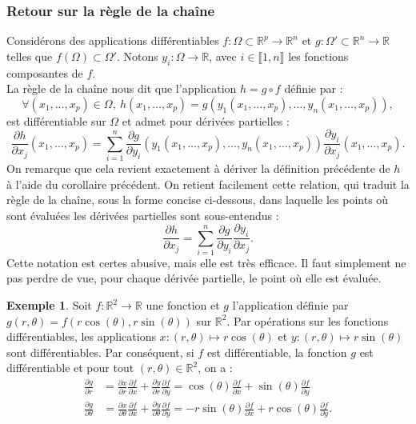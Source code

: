 \documentclass[french]{article}
\newcommand{\R}{\mathbb{R}}
\theoremstyle{plain}
\theoremstyle{definition}
\newtheorem*{ex}{Exemple}
\theoremstyle{remark}
\begin{document}
\subsubsection*{Retour sur la règle de la chaîne}

Considérons des applications différentiables $f:\Omega\subset\R^p\to\R^n$ et $g:\Omega'\subset\R^n\to\R$ telles que $f(\Omega)\subset\Omega'$. Notons $y_i:\Omega\to\R$, avec $i\in\llbracket1,n\rrbracket$ les fonctions composantes de $f$. \\
La règle de la chaîne nous dit que l'application $h=g\circ f$ définie par :
$$\forall (x_1,\ldots,x_p)\in\Omega,\ h(x_1,\ldots,x_p)=g(y_1(x_1,\ldots,x_p),\ldots,y_n(x_1,\ldots,x_p)),$$ est différentiable sur $\Omega$ et admet pour dérivées partielles :
$$\frac{\partial h}{\partial x_j}(x_1,\ldots,x_p)=\sum_{i=1}^{n}\frac{\partial g}{\partial y_i}(y_1(x_1,\ldots,x_p),\ldots,y_n(x_1,\ldots,x_p))\frac{\partial y_i}{\partial x_j}(x_1,\ldots,x_p).$$
On remarque que cela revient exactement à dériver la définition précédente de $h$ à l'aide du corollaire précédent. On retient facilement cette relation, qui traduit la règle de la chaîne, sous la forme concise ci-dessous, dans laquelle les points où sont évaluées les dérivées partielles sont sous-entendus :
$$\frac{\partial h}{\partial x_j}=\sum_{i=1}^{n}\frac{\partial g}{\partial y_i}\frac{\partial y_i}{\partial x_j}.$$
Cette notation est certes abusive, mais elle est très efficace. Il faut simplement ne pas perdre de vue, pour chaque dérivée partielle, le point où elle est évaluée.

\begin{ex}
	Soit $f:\R^2\to\R$ une fonction et $g$ l'application définie par $g(r,\theta)=f(r\cos(\theta),r\sin(\theta))$ sur $\R^2$. Par opérations sur les fonctions différentiables, les applications $x:(r,\theta)\mapsto r\cos(\theta)$ et $y:(r,\theta)\mapsto r\sin(\theta)$ sont différentiables. Par conséquent, si $f$ est différentiable, la fonction $g$ est différentiable et pour tout $(r,\theta)\in\R^2$, on a :
	\begin{align*}
		\frac{\partial g}{\partial r}&=\frac{\partial x}{\partial r}\frac{\partial f}{\partial x}+\frac{\partial y}{\partial r}\frac{\partial f}{\partial y}=\cos(\theta)\frac{\partial f}{\partial x}+\sin(\theta)\frac{\partial f}{\partial y}\\[2mm]
		\frac{\partial g}{\partial \theta}&=\frac{\partial x}{\partial \theta}\frac{\partial f}{\partial x}+\frac{\partial y}{\partial \theta}\frac{\partial f}{\partial y}=-r\sin(\theta)\frac{\partial f}{\partial x}+r\cos(\theta)\frac{\partial f}{\partial y}.
	\end{align*}
\end{ex}
\end{document}
